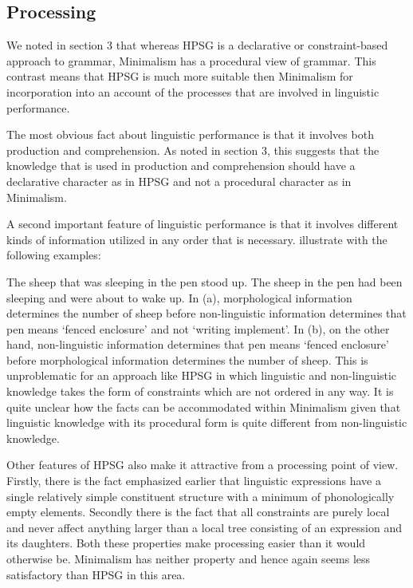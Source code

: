 \documentclass[output=paper]{langsci/langscibook}
\begin{document}
\subsection{Processing}

We noted in section 3 that whereas HPSG is a declarative or constraint-based approach to grammar,
Minimalism has a procedural view of grammar. This contrast means that HPSG is much more suitable
then Minimalism for incorporation into an account of the processes that are involved in linguistic
performance.

	The most obvious fact about linguistic performance is that it involves both production and comprehension. As noted in section 3, this suggests that the knowledge that is used in production and comprehension should have a declarative character as in HPSG and not a procedural character as in Minimalism. 

A second important feature of linguistic performance is that it involves different kinds of
information utilized in any order that is necessary. \citet{SW2011a} illustrate with the
following examples: 

\eal
\ex The sheep that was sleeping in the pen stood up.
\ex The sheep in the pen had been sleeping and were about to wake up.
\zl
In (a), morphological information determines the number of sheep before non-linguistic
information determines that pen means ‘fenced enclosure’ and not ‘writing implement’. In (b),
on the other hand, non-linguistic information determines that pen means ‘fenced enclosure’ before
morphological information determines the number of sheep. This is unproblematic for an approach like
HPSG in which linguistic and non-linguistic knowledge takes the form of constraints which are not
ordered in any way. It is quite unclear how the facts can be accommodated within Minimalism given
that linguistic knowledge with its procedural form is quite different from non-linguistic
knowledge. 

Other features of HPSG also make it attractive from a processing point of view. Firstly, there is
the fact emphasized earlier that linguistic expressions have a single relatively simple constituent
structure with a minimum of phonologically empty elements. Secondly there is the fact that all
constraints are purely local and never affect anything larger than a local tree consisting of an
expression and its daughters. Both these properties make processing easier than it would otherwise
be. Minimalism has neither property and hence again seems less satisfactory than HPSG in this area. 
\end{document}
